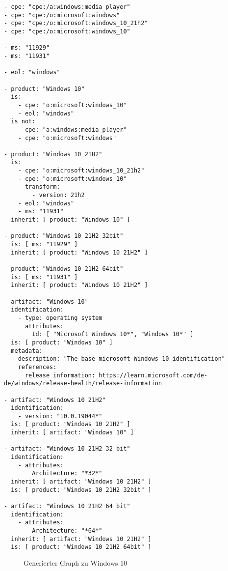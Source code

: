 \begin{lstlisting}[style=yaml,caption={Produktmodellierung zu Windows 10},label={lst:new-correlation-windows-10},basicstyle=\ttfamily\scriptsize]
- cpe: "cpe:/a:windows:media_player"
- cpe: "cpe:/o:microsoft:windows"
- cpe: "cpe:/o:microsoft:windows_10_21h2"
- cpe: "cpe:/o:microsoft:windows_10"

- ms: "11929"
- ms: "11931"

- eol: "windows"

- product: "Windows 10"
  is:
    - cpe: "o:microsoft:windows_10"
    - eol: "windows"
  is not:
    - cpe: "a:windows:media_player"
    - cpe: "o:microsoft:windows"

- product: "Windows 10 21H2"
  is:
    - cpe: "o:microsoft:windows_10_21h2"
    - cpe: "o:microsoft:windows_10"
      transform:
        - version: 21h2
    - eol: "windows"
    - ms: "11931"
  inherit: [ product: "Windows 10" ]

- product: "Windows 10 21H2 32bit"
  is: [ ms: "11929" ]
  inherit: [ product: "Windows 10 21H2" ]

- product: "Windows 10 21H2 64bit"
  is: [ ms: "11931" ]
  inherit: [ product: "Windows 10 21H2" ]

- artifact: "Windows 10"
  identification:
    - type: operating system
      attributes:
        Id: [ "Microsoft Windows 10*", "Windows 10*" ]
  is: [ product: "Windows 10" ]
  metadata:
    description: "The base microsoft Windows 10 identification"
    references:
      release information: https://learn.microsoft.com/de-de/windows/release-health/release-information

- artifact: "Windows 10 21H2"
  identification:
    - version: "10.0.19044*"
  is: [ product: "Windows 10 21H2" ]
  inherit: [ artifact: "Windows 10" ]

- artifact: "Windows 10 21H2 32 bit"
  identification:
    - attributes:
        Architecture: "*32*"
  inherit: [ artifact: "Windows 10 21H2" ]
  is: [ product: "Windows 10 21H2 32bit" ]

- artifact: "Windows 10 21H2 64 bit"
  identification:
    - attributes:
        Architecture: "*64*"
  inherit: [ artifact: "Windows 10 21H2" ]
  is: [ product: "Windows 10 21H2 64bit" ]
\end{lstlisting}

\begin{figure}[htbp]
    \centering
    \makebox[\textwidth]{}
    \caption{Generierter Graph zu Windows 10}
    \label{fig:example-graph-windows-10}
\end{figure}
